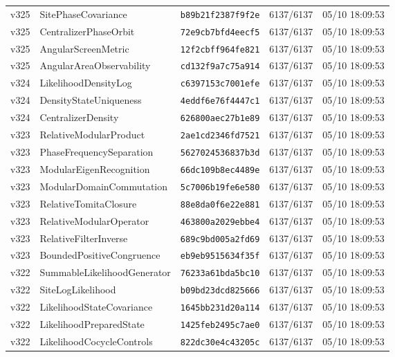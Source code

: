 \documentclass[11pt]{article}
\theoremstyle{definition}\newtheorem{deriv}{Derivation}
\begin{document}
{\begin{longtable}{@{}lllll@{}}
v325 & SitePhaseCovariance & \texttt{b89b21f2387f9f2e} & 6137/6137 & 05/10 18:09:53 \\
v325 & CentralizerPhaseOrbit & \texttt{72e9cb7bfd4eecf5} & 6137/6137 & 05/10 18:09:53 \\
v325 & AngularScreenMetric & \texttt{12f2cbff964fe821} & 6137/6137 & 05/10 18:09:53 \\
v325 & AngularAreaObservability & \texttt{cd132f9a7c75a914} & 6137/6137 & 05/10 18:09:53 \\
v324 & LikelihoodDensityLog & \texttt{c6397153c7001efe} & 6137/6137 & 05/10 18:09:53 \\
v324 & DensityStateUniqueness & \texttt{4eddf6e76f4447c1} & 6137/6137 & 05/10 18:09:53 \\
v324 & CentralizerDensity & \texttt{626800aec27b1e89} & 6137/6137 & 05/10 18:09:53 \\
v323 & RelativeModularProduct & \texttt{2ae1cd2346fd7521} & 6137/6137 & 05/10 18:09:53 \\
v323 & PhaseFrequencySeparation & \texttt{5627024536837b3d} & 6137/6137 & 05/10 18:09:53 \\
v323 & ModularEigenRecognition & \texttt{66dc109b8ec4489e} & 6137/6137 & 05/10 18:09:53 \\
v323 & ModularDomainCommutation & \texttt{5c7006b19fe6e580} & 6137/6137 & 05/10 18:09:53 \\
v323 & RelativeTomitaClosure & \texttt{88e8da0f6e22e881} & 6137/6137 & 05/10 18:09:53 \\
v323 & RelativeModularOperator & \texttt{463800a2029ebbe4} & 6137/6137 & 05/10 18:09:53 \\
v323 & RelativeFilterInverse & \texttt{689c9bd005a2fd69} & 6137/6137 & 05/10 18:09:53 \\
v323 & BoundedPositiveCongruence & \texttt{eb9eb9515634f35f} & 6137/6137 & 05/10 18:09:53 \\
v322 & SummableLikelihoodGenerator & \texttt{76233a61bda5bc10} & 6137/6137 & 05/10 18:09:53 \\
v322 & SiteLogLikelihood & \texttt{b09bd23dcd825666} & 6137/6137 & 05/10 18:09:53 \\
v322 & LikelihoodStateCovariance & \texttt{1645bb231d20a114} & 6137/6137 & 05/10 18:09:53 \\
v322 & LikelihoodPreparedState & \texttt{1425feb2495c7ae0} & 6137/6137 & 05/10 18:09:53 \\
v322 & LikelihoodCocycleControls & \texttt{822dc30e4c43205c} & 6137/6137 & 05/10 18:09:53 \\

\end{longtable}}
\end{document}
